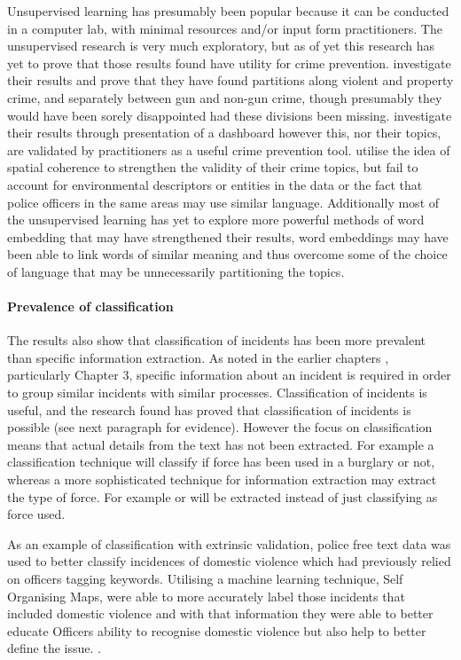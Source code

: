 Unsupervised learning has presumably been popular because it can be conducted in a computer lab, with minimal resources and/or input form practitioners. The unsupervised research is very much exploratory, but as of yet this research has yet to prove that those results found have utility for crime prevention. \textcite{kuang2017crime}  investigate their results and prove that they have found partitions along violent and property crime, and separately between gun and non-gun crime, though presumably they would have been sorely disappointed had these divisions been missing. \textcite{birks2020unsupervised}  investigate their results through presentation of a dashboard however this, nor their topics, are validated by practitioners as a useful crime prevention tool.  \textcite{Pandey201876} utilise the idea of spatial coherence to strengthen the validity of their crime topics, but fail to account for environmental descriptors or entities in the data or the fact that police officers in the same areas may use similar language. Additionally most of the unsupervised learning has yet to explore more powerful methods of word embedding that may have strengthened their results, word embeddings may have been able to link words of  similar meaning and thus overcome some of the choice of language that may be unnecessarily partitioning the topics.


\paragraph{Prevalence of classification}

The results also show that classification of incidents has been more prevalent than specific information extraction. As noted in the earlier chapters , particularly Chapter 3, specific information about an incident is required in order to group similar incidents with similar processes. Classification of incidents is useful, and the research found has proved that classification of incidents is possible (see next paragraph for evidence).  However the focus on classification means that actual details from the text has not been extracted. For example a classification technique will classify if force has been used in a burglary or not, whereas a more sophisticated technique for information extraction may extract the type of force. For example  or  will be extracted instead of just classifying as force used.

As an example of classification with extrinsic validation, police free text data was used to better classify incidences of domestic violence which had previously relied on officers tagging keywords. Utilising a machine learning technique,  Self Organising Maps, \textcite{Poelmans200911864} were able to more accurately label those incidents that included domestic violence and with that information they were able to better educate Officers ability to recognise domestic violence but also help to better define the issue. \parencite{ Poelmans2009247, Poelmans20113870, Poelmans200911864}.


